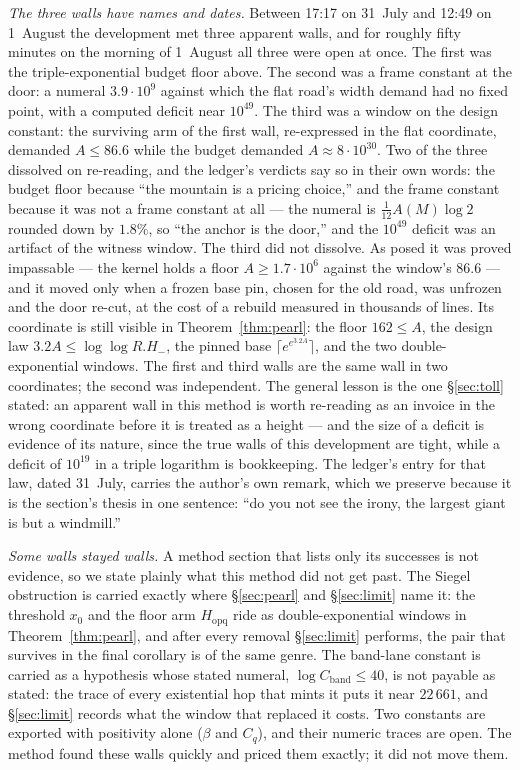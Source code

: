 \documentclass[11pt]{amsart}
\theoremstyle{remark}
\begin{document}
\emph{The three walls have names and dates.} Between 17:17 on 31~July
and 12:49 on 1~August the development met three apparent walls, and for
roughly fifty minutes on the morning of 1~August all three were open at
once. The first was the triple-exponential budget floor above. The
second was a frame constant at the door: a numeral $3.9\cdot10^{9}$
against which the flat road's width demand had no fixed point, with a
computed deficit near $10^{49}$. The third was a window on the design
constant: the surviving arm of the first wall, re-expressed in the flat
coordinate, demanded $A \le 86.6$ while the budget demanded
$A \approx 8\cdot10^{30}$. Two of the three dissolved on re-reading,
and the ledger's verdicts say so in their own words: the budget floor
because ``the mountain is a pricing choice,'' and the frame constant
because it was not a frame constant at all --- the numeral is
$\tfrac{1}{12}A(M)\log 2$ rounded down by $1.8\%$, so ``the anchor is
the door,'' and the $10^{49}$ deficit was an artifact of the witness
window. The third did not dissolve. As posed it was proved impassable
--- the kernel holds a floor $A \ge 1.7\cdot10^{6}$ against the
window's $86.6$ --- and it moved only when a frozen base pin, chosen
for the old road, was unfrozen and the door re-cut, at the cost of a
rebuild measured in thousands of lines. Its coordinate is still visible
in Theorem~\ref{thm:pearl}: the floor $162 \le A$, the design law
$3.2A \le \log\log R.H_-$, the pinned base
$\lceil e^{e^{3.2A}}\rceil$, and the two double-exponential windows.
The first and third walls are the same wall in two coordinates; the
second was independent. The general lesson is the one
\S\ref{sec:toll} stated: an apparent wall in this method is worth
re-reading as an invoice in the wrong coordinate before it is treated
as a height --- and the size of a deficit is evidence of its nature,
since the true walls of this development are tight, while a deficit of
$10^{19}$ in a triple logarithm is bookkeeping. The ledger's entry for
that law, dated 31~July, carries the author's own remark, which we
preserve because it is the section's thesis in one sentence: ``do you
not see the irony, the largest giant is but a windmill.''

\emph{Some walls stayed walls.} A method section that lists only its
successes is not evidence, so we state plainly what this method did not
get past. The Siegel obstruction is carried exactly where
\S\ref{sec:pearl} and \S\ref{sec:limit} name it: the threshold $x_0$
and the floor arm $H_{\mathrm{opq}}$ ride as double-exponential windows
in Theorem~\ref{thm:pearl}, and after every removal \S\ref{sec:limit}
performs, the pair that survives in the final corollary is of the same
genre. The band-lane constant is carried as a hypothesis whose stated
numeral, $\log C_{\mathrm{band}} \le 40$, is not payable as stated:
the trace of every existential hop that mints it puts it near
$22\,661$, and \S\ref{sec:limit} records what the window that replaced
it costs. Two constants are exported with positivity alone ($\beta$ and
$C_q$), and their numeric traces are open. The method found these walls
quickly and priced them exactly; it did not move them.
\end{document}
